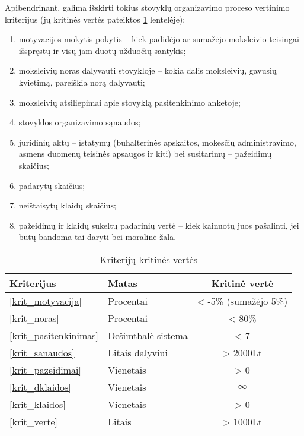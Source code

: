 Apibendrinant, galima išskirti tokius stovyklų organizavimo proceso 
vertinimo kriterijus (jų kritinės vertės pateiktos \ref{tab:krit}
lentelėje):
\begin{enumerate}
  \item \label{krit_motyvacija}
    motyvacijos mokytis pokytis – kiek padidėjo
    ar sumažėjo moksleivio teisingai išspręstų ir visų jam duotų užduočių
    santykis; 
  \item \label{krit_noras}
    moksleivių noras dalyvauti stovykloje – kokia 
    dalis moksleivių, gavusių kvietimą, pareiškia norą dalyvauti;
  \item \label{krit_pasitenkinimas}
    moksleivių atsiliepimai apie stovyklą pasitenkinimo anketoje;
  \item \label{krit_sanaudos}
    stovyklos organizavimo sąnaudos;
  \item \label{krit_pazeidimai}
    juridinių aktų – įstatymų (buhalterinės apskaitos,
    mokesčių administravimo, asmens duomenų teisinės apsaugos
    ir kiti) bei susitarimų – pažeidimų skaičius;
  \item \label{krit_dklaidos}
    padarytų \glsdarbkldgsk {} skaičius;
  \item \label{krit_klaidos}
    neištaisytų klaidų skaičius;
  \item \label{krit_verte}
    pažeidimų  ir klaidų sukeltų padarinių vertė – kiek kainuotų juos 
    pašalinti, jei būtų bandoma tai daryti bei moralinė žala.

\end{enumerate}

\begin{table}[h!]
  \centering
  \begin{tabular}[]{| l | l | c |}
    \hline
    Kriterijus & Matas & Kritinė vertė \\
    \hline
    \ref{krit_motyvacija} & Procentai & < -5\% (sumažėjo 5\%) \\
    \hline
    \ref{krit_noras} & Procentai & < 80\% \\
    \hline
    \ref{krit_pasitenkinimas} & Dešimtbalė sistema & < 7 \\
    \hline
    \ref{krit_sanaudos} & Litais dalyviui & > 2000Lt \\
    \hline
    \ref{krit_pazeidimai} & Vienetais & > 0 \\
    \hline
    \ref{krit_dklaidos} & Vienetais & 
    $\infty$\footnotemark[1]\\
    \hline
    \ref{krit_klaidos} & Vienetais & > 0 \\ 
    \hline
    \ref{krit_verte} & Litais & > 1000Lt \\
    \hline
  \end{tabular}
  \caption{Kriterijų kritinės vertės}
  \label{tab:krit}
\end{table}

